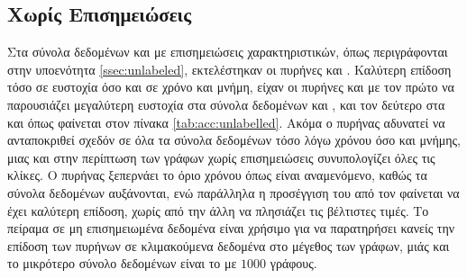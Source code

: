 \subsection{Χωρίς Επισημειώσεις}
Στα σύνολα δεδομένων  και  με επισημειώσεις χαρακτηριστικών, όπως περιγράφονται στην υποενότητα \ref{ssec:unlabeled}, εκτελέστηκαν οι πυρήνες 
 και .
Καλύτερη επίδοση τόσο σε ευστοχία όσο και σε χρόνο και μνήμη, είχαν οι πυρήνες  και  με τον πρώτο να παρουσιάζει μεγαλύτερη ευστοχία στα σύνολα δεδομένων  και ,  και τον δεύτερο στα  και  όπως φαίνεται στον πίνακα \ref{tab:acc:unlabelled}.
Ακόμα ο πυρήνας  αδυνατεί να ανταποκριθεί σχεδόν σε όλα τα σύνολα δεδομένων τόσο λόγω χρόνου όσο και μνήμης, μιας και στην περίπτωση των γράφων χωρίς επισημειώσεις συνυπολογίζει όλες τις κλίκες.
Ο πυρήνας  ξεπερνάει το όριο χρόνου όπως είναι αναμενόμενο, καθώς τα σύνολα δεδομένων αυξάνονται, ενώ παράλληλα η προσέγγιση του από τον  φαίνεται να έχει καλύτερη επίδοση, χωρίς από την άλλη να πλησιάζει τις βέλτιστες τιμές.
Το πείραμα σε μη επισημειωμένα δεδομένα είναι χρήσιμο για να παρατηρήσει κανείς την επίδοση των πυρήνων σε κλιμακούμενα δεδομένα στο μέγεθος των γράφων, μιάς και το μικρότερο σύνολο δεδομένων είναι το  με $1000$ γράφους.
